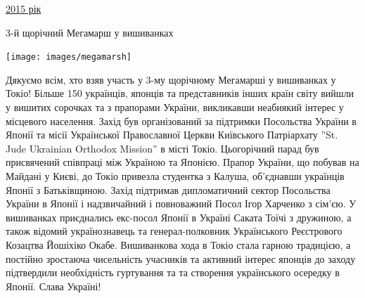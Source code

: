 \documentclass[10pt,a4paper]{article}
\newcommand{\Category}[1]{%
		\begin{center}	
			\Large \usefont{T2A}{kurier}{m}{n}
			\underline{#1}%
		\end{center}	
		\par \normalsize \normalfont}
\newcommand{\NewsItem}[1]{%
		\usefont{T2A}{iwona}{m}{n} 
		\large #1 \vspace{4pt}
		\par \normalsize \normalfont}
\begin{document}
\newpage

\Category{2015 рік}
\begin{center}
\NewsItem{3-й щорічний Мегамарш у вишиванках}	
\texttt{[image: images/megamarsh]}
\end{center}

\begin{multicols}{3}
Дякуємо всім, хто взяв участь у 3-му щорічному Мегамарші у вишиванках у Токіо! Більше 150 українців, японців та представників інших країн світу вийшли у вишитих сорочках та з прапорами України, викликавши неабиякий інтерес у місцевого населення. Захід був організований за підтримки Посольства України в Японії та місії Української Православної Церкви Київського Патріархату ''St. Jude Ukrainian Orthodox Mission'' в місті Токіо. Цьогорічний парад був присвячений співпраці між Україною та Японією. Прапор України, що побував на Майдані у Києві, до Токіо привезла студентка з Калуша, об'єднавши українців Японії з Батьківщиною. Захід підтримав дипломатичний сектор Посольства України в Японії і надзвичайний і повноважний Посол Ігор Харченко з сім'єю. У вишиванках приєднались екс-посол Японії в Україні Саката Тоїчі з дружиною, а також відомий українознавець та генерал-полковник Українського Реєстрового Козацтва Йошіхіко Окабе. Вишиванкова хода в Токіо стала гарною традицією, а постійно зростаюча чисельність учасників та активний інтерес японців до заходу підтвердили необхідність гуртування та та створення українського осередку в Японії. Слава Україні!
\end{multicols}
 
\end{document}
